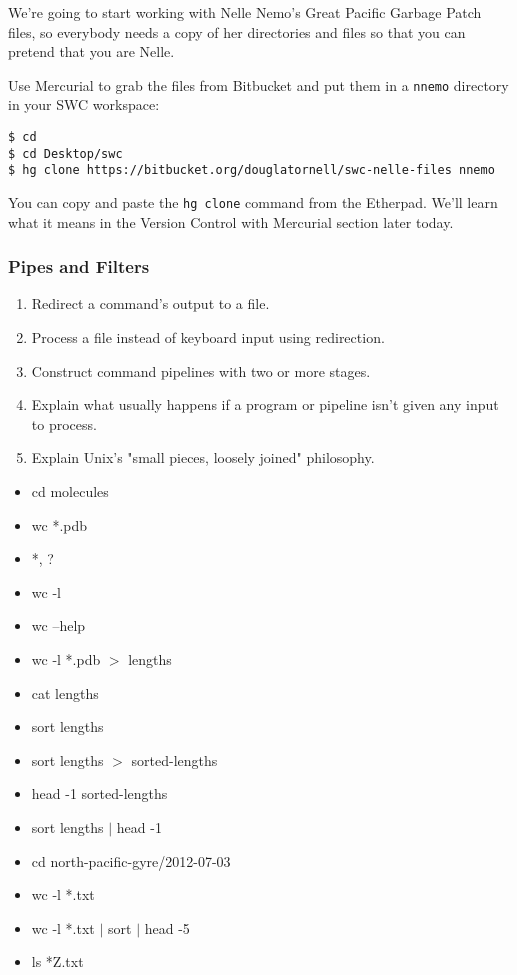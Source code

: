 \documentclass[xcolor=dvipsnames]{beamer}
\begin{document}
\begin{frame}[fragile]
We're going to start working with Nelle Nemo's Great Pacific Garbage Patch files,
so everybody needs a copy of her directories and files so that you can pretend that you are Nelle.

Use Mercurial to grab the files from Bitbucket and put them in a {\tt nnemo} directory in your SWC workspace:
{\footnotesize
\begin{verbatim}
$ cd
$ cd Desktop/swc
$ hg clone https://bitbucket.org/douglatornell/swc-nelle-files nnemo
\end{verbatim}
}

You can copy and paste the {\tt hg clone} command from the Etherpad.
We'll learn what it means in the Version Control with Mercurial section later today.
\end{frame}


\begin{frame}
\frametitle{Pipes and Filters}
\begin{enumerate}

\item    Redirect a command's output to a file.
\item    Process a file instead of keyboard input using redirection.
\item    Construct command pipelines with two or more stages.
\item    Explain what usually happens if a program or pipeline isn't given any input to process.
\item    Explain Unix's "small pieces, loosely joined" philosophy.

\end{enumerate}
\begin{multicols}{2}
\begin{itemize}
\item cd molecules
\item wc *.pdb
\item *, ?
\item wc -l
\item wc --help
\item wc -l *.pdb $>$ lengths
\item cat lengths
\item sort lengths
\item sort lengths $>$ sorted-lengths
\item head -1 sorted-lengths
\item sort lengths $|$ head -1
\item cd north-pacific-gyre/2012-07-03
\item wc -l *.txt
\item wc -l *.txt $|$ sort $|$ head -5
\item ls *Z.txt
\end{itemize}
\end{multicols}
\end{frame}
\end{document}
